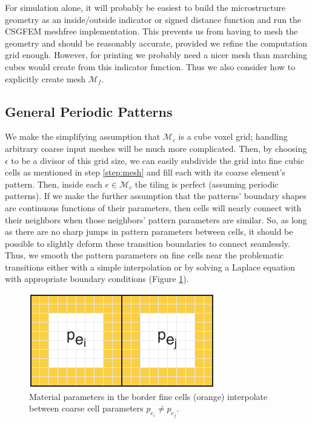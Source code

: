 \documentclass[10pt]{article}
\providecommand{\mesh}{\mathcal{M}}
\begin{document}
For simulation alone, it will probably be easiest to build the
microstructure geometry as an inside/outside indicator or signed distance
function and run the CSGFEM meshfree implementation. This prevents us from
having to mesh the geometry and should be reasonably accurate, provided we
refine the computation grid enough. However, for printing we probably need a
nicer mesh than marching cubes would create from this indicator function.
Thus we also consider how to explicitly create mesh $\mesh_f$.

\subsection{General Periodic Patterns}
\label{sec:general_periodic}
We make the simplifying assumption that $\mesh_c$ is a cube voxel grid; handling
arbitrary coarse input meshes will be much more complicated. Then, by choosing
$\epsilon$ to be a divisor of this grid size, we can easily subdivide the grid
into fine cubic cells as mentioned in step \ref{step:mesh} and fill each with
its coarse element's pattern. Then, inside each $e \in \mesh_c$ the tiling is
perfect (assuming periodic patterns). If we make the further assumption that the
patterns' boundary shapes are continuous functions of their parameters, then
cells will nearly connect with their neighbors when those neighbors' pattern
parameters are similar. So, as long as there are no sharp jumps in pattern
parameters between cells, it should be possible to slightly deform these
transition boundaries to connect seamlessly. Thus, we smooth
the pattern parameters on fine cells near the problematic transitions either
with a simple interpolation or by solving a Laplace equation with appropriate
boundary conditions (Figure \ref{fig:interpolate}).

\begin{figure}
    \centering
    \includegraphics[height=.15\textheight]{images/pattern_interp.pdf}
    \caption{Material parameters in the border fine cells (orange) interpolate
    between coarse cell parameters $p_{e_i} \ne p_{e_j}$.}
    \label{fig:interpolate}
\end{figure}
\end{document}
